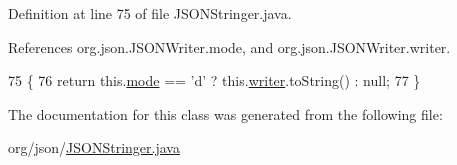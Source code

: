 Definition at line 75 of file J\-S\-O\-N\-Stringer.\-java.



References org.\-json.\-J\-S\-O\-N\-Writer.\-mode, and org.\-json.\-J\-S\-O\-N\-Writer.\-writer.


\begin{DoxyCode}
75                              \{
76         \textcolor{keywordflow}{return} this.\hyperlink{classorg_1_1json_1_1_j_s_o_n_writer_acabe6b245b148eabfaa3cf975f98073f}{mode} == \textcolor{charliteral}{'d'} ? this.\hyperlink{classorg_1_1json_1_1_j_s_o_n_writer_ae5398a9b83a17ab31c993c52fc1c8e06}{writer}.toString() : null;
77     \}
\end{DoxyCode}


The documentation for this class was generated from the following file\-:\begin{DoxyCompactItemize}
\item 
org/json/\hyperlink{_j_s_o_n_stringer_8java}{J\-S\-O\-N\-Stringer.\-java}\end{DoxyCompactItemize}
